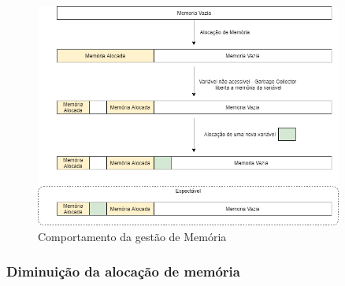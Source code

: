 \begin{figure}[ht]
\centering
\includegraphics[width=0.90\textwidth]{images/memo.png}
\caption{Comportamento da gestão de Memória}\label{memo}
\end{figure}



\subsubsection {Diminuição da alocação de memória}

